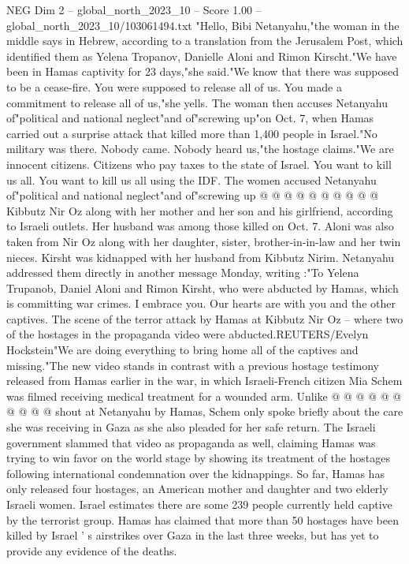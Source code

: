 \begin{textsample}{NEG Dim 2 – global\_north\_2023\_10 – Score 1.00 – global\_north\_2023\_10/103061494.txt}  \label{ex:f2_neg_162}
"Hello, Bibi Netanyahu,"the woman in the middle says in Hebrew, according to a translation from the Jerusalem Post, which identified them as Yelena Tropanov, Danielle Aloni and Rimon Kirscht."We have been in Hamas captivity for 23 days,"she said."We know that there was supposed to be a cease-fire.
You were supposed to release all of us.
You made a commitment to release all of us,"she yells.
The woman then accuses Netanyahu of"political and national neglect"and of"screwing up"on Oct. 7, when Hamas carried out a surprise attack that killed more than 1,400 people in Israel."No military was there.
Nobody came.
Nobody heard us,"the hostage claims."We are innocent citizens.
Citizens who pay taxes to the state of Israel.
You want to kill us all.
You want to kill us all using the IDF.
The women accused Netanyahu of"political and national neglect"and of"screwing up @ @ @ @ @ @ @ @ @ @ Kibbutz Nir Oz along with her mother and her son and his girlfriend, according to Israeli outlets.
Her husband was among those killed on Oct. 7.
Aloni was also taken from Nir Oz along with her daughter, sister, brother-in-in-law and her twin nieces.
Kirsht was kidnapped with her husband from Kibbutz Nirim.
Netanyahu addressed them directly in another message Monday, writing :"To Yelena Trupanob, Daniel Aloni and Rimon Kirsht, who were abducted by Hamas, which is committing war crimes.
I embrace you.
Our hearts are with you and the other captives.
The scene of the terror attack by Hamas at Kibbutz Nir Oz -- where two of the hostages in the propaganda video were abducted.REUTERS/Evelyn Hockstein"We are doing everything to bring home all of the captives and missing."The new video stands in contrast with a previous hostage testimony released from Hamas earlier in the war, in which Israeli-French citizen Mia Schem was filmed receiving medical treatment for a wounded arm.
Unlike @ @ @ @ @ @ @ @ @ @ shout at Netanyahu by Hamas, Schem only spoke briefly about the care she was receiving in Gaza as she also pleaded for her safe return.
The Israeli government slammed that video as propaganda as well, claiming Hamas was trying to win favor on the world stage by showing its treatment of the hostages following international condemnation over the kidnappings.
So far, Hamas has only released four hostages, an American mother and daughter and two elderly Israeli women.
Israel estimates there are some 239 people currently held captive by the terrorist group.
Hamas has claimed that more than 50 hostages have been killed by Israel ' s airstrikes over Gaza in the last three weeks, but has yet to provide any evidence of the deaths.

\end{textsample}
